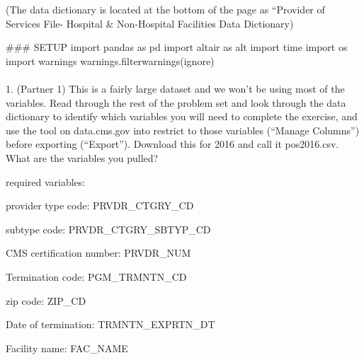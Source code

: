\documentclass[
  letterpaper,
  DIV=11,
  numbers=noendperiod]{scrartcl}
\makeatletter
\let\oldparagraph\paragraph
\renewcommand{\paragraph}{
    \@ifstar
      \xxxParagraphStar
      \xxxParagraphNoStar
  }
\newcommand{\xxxParagraphStar}[1]{\oldparagraph*{#1}\mbox{}}
\newcommand{\xxxParagraphNoStar}[1]{\oldparagraph{#1}\mbox{}}
\newenvironment{Shaded}{\begin{snugshade}}{\end{snugshade}}
\newcommand{\CommentTok}[1]{\textcolor[rgb]{0.37,0.37,0.37}{#1}}
\newcommand{\ImportTok}[1]{\textcolor[rgb]{0.00,0.46,0.62}{#1}}
\newcommand{\NormalTok}[1]{\textcolor[rgb]{0.00,0.23,0.31}{#1}}
\newcommand{\StringTok}[1]{\textcolor[rgb]{0.13,0.47,0.30}{#1}}
\makeatother
\begin{document}
(The data dictionary is located at the bottom of the page as ``Provider
of Services File- Hospital \& Non-Hospital Facilities Data Dictionary)

\begin{Shaded}
\begin{Highlighting}[]
\CommentTok{\#\#\# SETUP }
\ImportTok{import}\NormalTok{ pandas }\ImportTok{as}\NormalTok{ pd}
\ImportTok{import}\NormalTok{ altair }\ImportTok{as}\NormalTok{ alt}
\ImportTok{import}\NormalTok{ time}
\ImportTok{import}\NormalTok{ os}
\ImportTok{import}\NormalTok{ warnings }
\NormalTok{warnings.filterwarnings(}\StringTok{\textquotesingle{}ignore\textquotesingle{}}\NormalTok{)}
\end{Highlighting}
\end{Shaded}

\paragraph{1. (Partner 1) This is a fairly large dataset and we won't be
using most of the variables. Read through the rest of the problem set
and look through the data dictionary to identify which variables you
will need to complete the exercise, and use the tool on data.cms.gov
into restrict to those variables (``Manage Columns'') before exporting
(``Export''). Download this for 2016 and call it pos2016.csv. What are
the variables you
pulled?}\label{partner-1-this-is-a-fairly-large-dataset-and-we-wont-be-using-most-of-the-variables.-read-through-the-rest-of-the-problem-set-and-look-through-the-data-dictionary-to-identify-which-variables-you-will-need-to-complete-the-exercise-and-use-the-tool-on-data.cms.gov-into-restrict-to-those-variables-manage-columns-before-exporting-export.-download-this-for-2016-and-call-it-pos2016.csv.-what-are-the-variables-you-pulled}

required variables:

provider type code: PRVDR\_CTGRY\_CD

subtype code: PRVDR\_CTGRY\_SBTYP\_CD

CMS certification number: PRVDR\_NUM

Termination code: PGM\_TRMNTN\_CD

zip code: ZIP\_CD

Date of termination: TRMNTN\_EXPRTN\_DT

Facility name: FAC\_NAME
\end{document}
